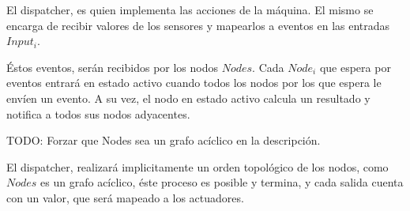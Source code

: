 \begin{enumerate}
  El dispatcher, es quien implementa las acciones de la máquina.
  El mismo se encarga de recibir valores de los sensores y mapearlos
a eventos en las entradas $Input_i$.

  Éstos eventos, serán recibidos por los nodos $Nodes$.
  Cada $Node_i$ que espera por eventos entrará en estado activo cuando
todos los nodos por los que espera le envíen un evento.
  A su vez, el nodo en estado activo calcula un resultado y notifica a
todos sus nodos adyacentes.

  TODO: Forzar que Nodes sea un grafo acíclico en la descripción.

  El dispatcher, realizará implicitamente un orden topológico de los
nodos, como $Nodes$ es un grafo acíclico, éste proceso es posible y
termina, y cada salida cuenta con un valor, que será mapeado a los actuadores.

\end{enumerate}


